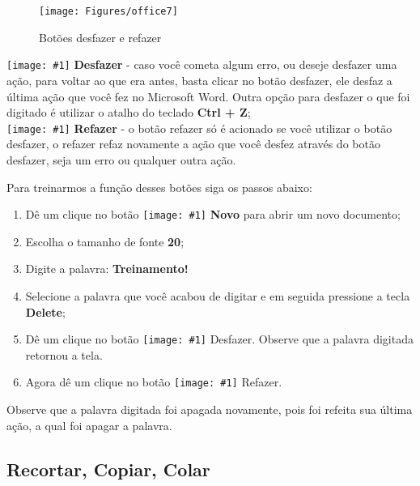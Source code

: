 \documentclass[hidelinks,12pt]{article}
\newcommand{\icon}[1]{\texttt{[image: \#1]}}
\begin{document}
	
	\begin{figure}[!h]
		\centering
		\texttt{[image: Figures/office7]}
		\label{fig:office7}
		\caption{Botões desfazer e refazer}
	\end{figure}
	
	\icon{Figures/desfazer} \textbf{Desfazer} - caso você cometa algum erro, ou deseje desfazer uma ação, para voltar ao que era antes, basta clicar no botão desfazer, ele desfaz a última ação que você fez no Microsoft Word. Outra opção para desfazer o que foi digitado é utilizar o atalho do teclado \textbf{Ctrl + Z};\\
	
	\icon{Figures/refazer} \textbf{Refazer} - o botão refazer só é acionado se você utilizar o botão desfazer, o refazer refaz novamente a ação que você desfez através do botão desfazer, seja um erro ou qualquer outra ação.
	
	Para treinarmos a função desses botões siga os passos abaixo:
	
	\begin{enumerate}
		\item Dê um clique no botão \icon{Figures/novo} \textbf{Novo} para abrir um novo documento;
		
		\item Escolha o tamanho de fonte \textbf{20};
		
		\item  Digite a palavra: \textbf{Treinamento!}
		
		
		\item Selecione a palavra que você acabou de digitar e em seguida pressione a tecla \textbf{Delete};
		
		\item Dê um clique no botão \icon{Figures/desfazer} Desfazer. Observe que a palavra digitada retornou  a tela.                                                               
		
		\item Agora dê um clique no botão \icon{Figures/refazer} Refazer.
	\end{enumerate}

	Observe que a palavra digitada foi apagada novamente, pois foi refeita sua última ação, a qual foi apagar a palavra.            
	
	
	\subsection{Recortar, Copiar, Colar}
	
\end{document}
